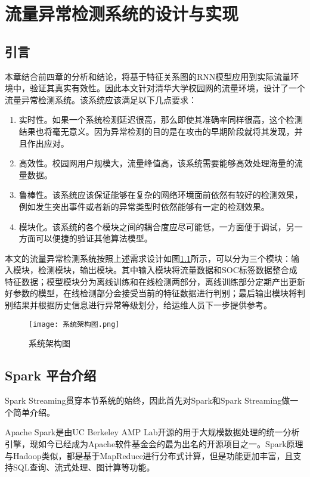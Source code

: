\chapter{流量异常检测系统的设计与实现}
\section{引言}
本章结合前四章的分析和结论，将基于特征关系图的RNN模型应用到实际流量环境中，验证其真实有效性。因此本文针对清华大学校园网的流量环境，设计了一个流量异常检测系统。该系统应该满足以下几点要求：
\begin{enumerate}
  \item 实时性。如果一个系统检测延迟很高，那么即使其准确率同样很高，这个检测结果也将毫无意义。因为异常检测的目的是在攻击的早期阶段就将其发现，并且作出应对。
  \item 高效性。校园网用户规模大，流量峰值高，该系统需要能够高效处理海量的流量数据。
  \item 鲁棒性。该系统应该保证能够在复杂的网络环境面前依然有较好的检测效果，例如发生突出事件或者新的异常类型时依然能够有一定的检测效果。
  \item 模块化。该系统的各个模块之间的耦合度应尽可能低，一方面便于调试，另一方面可以便捷的验证其他算法模型。
\end{enumerate}

本文的流量异常检测系统按照上述需求设计如图\ref{fig:arch}所示，可以分为三个模块：输入模块，检测模块，输出模块。其中输入模块将流量数据和SOC标签数据整合成特征数据；模型模块分为离线训练和在线检测两部分，离线训练部分定期产出更新好参数的模型，在线检测部分会接受当前的特征数据进行判别；最后输出模块将判别结果并根据历史信息进行异常等级划分，给运维人员下一步提供参考。
\begin{figure}
    \centering
    \texttt{[image: 系统架构图.png]}
    \caption{系统架构图}
    \label{fig:arch}
  \end{figure}


\section{Spark 平台介绍}
Spark Streaming贯穿本节系统的始终，因此首先对Spark和Spark Streaming做一个简单介绍。

Apache Spark是由UC Berkeley AMP Lab开源的用于大规模数据处理的统一分析引擎\cite{spark}，现如今已经成为Apache软件基金会的最为出名的开源项目之一。Spark原理与Hadoop类似，都是基于MapReduce进行分布式计算，但是功能更加丰富，且支持SQL查询、流式处理、图计算等功能。

